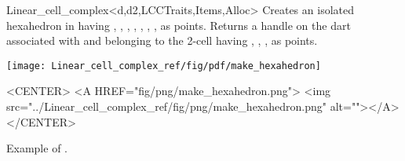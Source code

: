 \begin{ccRefClass}{Linear_cell_complex<d,d2,LCCTraits,Items,Alloc>}
{Creates an isolated hexahedron in  having , ,
, , , , ,  as points.
  Returns a handle on the dart associated with  and
  belonging to the 2-cell having , , , 
  as points.
}
\def\LargFig{.4\textwidth}
  \begin{ccTexOnly}
    \begin{center}
      \texttt{[image: Linear\_cell\_complex\_ref/fig/pdf/make\_hexahedron]}
    \end{center}
  \end{ccTexOnly}
  \begin{ccHtmlOnly}
    <CENTER>
    <A HREF="fig/png/make_hexahedron.png">
        <img src="../Linear_cell_complex_ref/fig/png/make_hexahedron.png" alt=""></A>
    </CENTER>
    \end{ccHtmlOnly}
    \centerline{Example of .}

\ccSeeAlso
{}\\
\\
\\
\\
\\
\\

\end{ccRefClass}
\ccRefPageEnd
